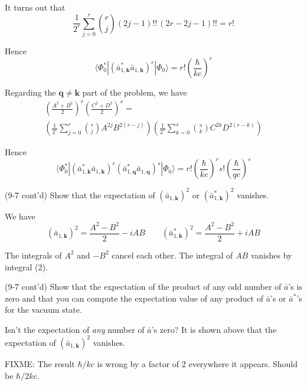 \documentclass[12pt]{article}
\begin{document}
It turns out that
\begin{equation*}
\frac{1}{2^r}\sum_{j=0}^r\binom{r}{j}(2j-1)!!\,(2r-2j-1)!!=r!
\end{equation*}

Hence
\begin{equation*}
\langle\Phi_0^*|(\bar a_{1,\mathbf k}^*\bar a_{1,\mathbf k})^r|\Phi_0\rangle
=r!\left(\frac{\hbar}{kc}\right)^r
\end{equation*}

Regarding the $\mathbf q\ne\mathbf k$ part of the problem, we have
\begin{multline*}
\left(\frac{A^2+B^2}{2}\right)^r\left(\frac{C^2+D^2}{2}\right)^s={}
\\
\left(\frac{1}{2^r}\sum_{j=0}^r\binom{r}{j}A^{2j}B^{2(r-j)}\right)
\left(\frac{1}{2^s}\sum_{k=0}^s\binom{s}{k}C^{2k}D^{2(r-k)}\right)
\end{multline*}

Hence
\begin{equation*}
\langle\Phi_0^*|
(\bar a_{1,\mathbf k}^*\bar a_{1,\mathbf k})^r
(\bar a_{1,\mathbf q}^*\bar a_{1,\mathbf q})^s
|\Phi_0\rangle
=r!\left(\frac{\hbar}{kc}\right)^r
s!\left(\frac{\hbar}{qc}\right)^s
\end{equation*}

(9-7 cont'd)
Show that the expectation of 
$(\bar a_{1,\mathbf k})^2$ or
$(\bar a_{1,\mathbf k}^*)^2$ vanishes.

\bigskip
We have
\begin{equation*}
(\bar a_{1,\mathbf k})^2=\frac{A^2-B^2}{2}-iAB
\qquad
(\bar a_{1,\mathbf k}^*)^2=\frac{A^2-B^2}{2}+iAB
\end{equation*}

The integrals of $A^2$ and $-B^2$ cancel each other.
The integral of $AB$ vanishes by integral (2).

\bigskip
(9-7 cont'd)
Show that the expectation of the product of any odd number of
$\bar a$'s is zero and that you can compute the expectation value of
any product of $\bar a$'s or $\bar a^*$'s for the vacuum state.

\bigskip
Isn't the expectation of {\it any} number of $\bar a$'s zero?
It is shown above that the expectation of $(\bar a_{1,\mathbf k})^2$ vanishes.

\bigskip
FIXME: The result $\hbar/kc$ is wrong by a factor of 2 everywhere it appears.
Should be $\hbar/2kc$.
\end{document}
